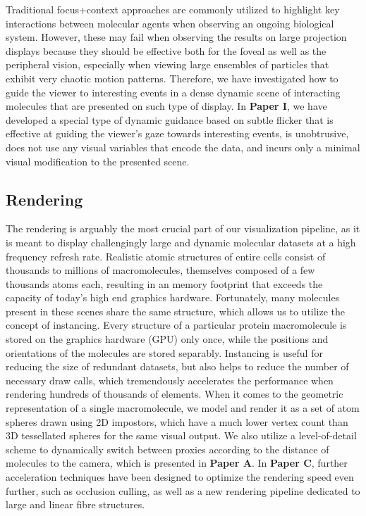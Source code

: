Traditional focus+context approaches are commonly utilized to highlight key interactions between molecular agents when observing an ongoing biological system.
However, these may fail when observing the results on large projection displays because they should be effective both for the foveal as well as the peripheral vision, especially when viewing large ensembles of particles that exhibit very chaotic motion patterns.
Therefore, we have investigated how to guide the viewer to interesting events in a dense dynamic scene of interacting molecules that are presented on such type of display.
In \textbf{Paper I}, we have developed a special type of dynamic guidance based on subtle flicker that is effective at guiding the viewer's gaze towards interesting events, is unobtrusive, does not use any visual variables that encode the data, and incurs only a minimal visual modification to the presented scene.

\subsection{Rendering}

The rendering is arguably the most crucial part of our visualization pipeline, as it is meant to display challengingly large and dynamic molecular datasets at a high frequency refresh rate.
Realistic atomic structures of entire cells consist of thousands to millions of macromolecules, themselves composed of a few thousands atoms each, resulting in an memory footprint that exceeds the capacity of today's high end graphics hardware.
Fortunately, many molecules present in these scenes share the same structure, which allows us to utilize the concept of instancing.
Every structure of a particular protein macromolecule is stored on the graphics hardware (GPU) only once, while the positions and orientations of the molecules are stored separably.
Instancing is useful for reducing the size of redundant datasets, but also helps to reduce the number of necessary draw calls, which tremendously accelerates the performance when rendering hundreds of thousands of elements. 
When it comes to the geometric representation of a single macromolecule, we model and render it as a set of atom spheres drawn using 2D impostors, which have a much lower vertex count than 3D tessellated spheres for the same visual output.
We also utilize a level-of-detail scheme to dynamically switch between proxies according to the distance of molecules to the camera, which is presented in \textbf{Paper A}.
In \textbf{Paper C}, further acceleration techniques have been designed to optimize the rendering speed even further, such as occlusion culling, as well as a new rendering pipeline dedicated to large and linear fibre structures.

